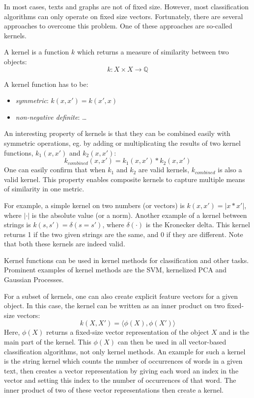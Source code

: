 In most cases, texts and graphs are not of fixed size.
However, most classification algorithms can only operate on fixed size vectors.
Fortunately, there are several approaches to overcome this problem.
One of these approaches are so-called kernels.

A kernel is a function $k$ which returns a measure of similarity between two objects:
\begin{equation*}
k: X \times X \rightarrow \mathbb{Q}
\end{equation*}

A kernel function has to be:
\begin{itemize}
    \item{\textit{symmetric}: $k(x, x') = k(x', x)$}
    \item{\textit{non-negative definite}: \dots}
\end{itemize}

An interesting property of kernels is that they can be combined easily with symmetric operations, eg. by adding or multiplicating the results of two kernel functions, $k_1(x, x')$ and $k_2(x, x')$:
\begin{equation*}
k_{combined}(x, x') = k_1(x, x') * k_2(x, x')
\end{equation*}
One can easily confirm that when $k_1$ and $k_2$ are valid kernels, $k_{combined}$ is also a valid kernel.
This property enables composite kernels to capture multiple means of similarity in one metric.

For example, a simple kernel on two numbers (or vectors) is $k(x, x') = | x * x' |$, where $| \cdot |$ is the absolute value (or a norm).
Another example of a kernel between strings is $k(s, s') = \delta(s = s')$, where $\delta(\cdot)$ is the Kronecker delta. This kernel returns 1 if the two given strings are the same, and 0 if they are different.
Note that both these kernels are indeed valid.

Kernel functions can be used in kernel methods for classification and other tasks.
Prominent examples of kernel methods are the SVM, kernelized PCA and Gaussian Processes.

For a subset of kernels, one can also create explicit feature vectors for a given object. In this case, the kernel can be written as an inner product on two fixed-size vectors:
\begin{equation*}
    k(X, X') = \langle \phi(X), \phi(X') \rangle
\end{equation*}
Here, $\phi(X)$ returns a fixed-size vector representation of the object $X$ and is the main part of the kernel.
This $\phi(X)$ can then be used in all vector-based classification algorithms, not only kernel methods.
An example for such a kernel is the string kernel which counts the number of occurrences of words in a given text, then creates a vector representation by giving each word an index in the vector and setting this index to the number of occurrences of that word. The inner product of two of these vector representations then create a kernel.

